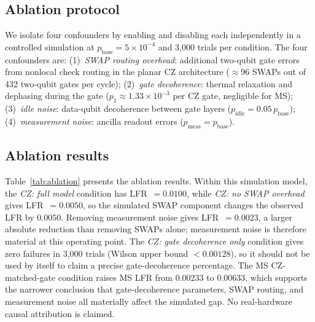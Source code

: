 \documentclass[11pt,a4paper]{article}
\begin{document}
\subsection{Ablation protocol}

We isolate four confounders by enabling and disabling each independently
in a controlled simulation at $p_{\mathrm{base}}=5\times10^{-4}$ and
3{,}000 trials per condition.
The four confounders are:
(1)~\emph{SWAP routing overhead}: additional two-qubit gate errors from
nonlocal check routing in the planar CZ architecture ($\approx96$ SWAPs
out of 432 two-qubit gates per cycle);
(2)~\emph{gate decoherence}: thermal relaxation and dephasing during the
gate ($p_1\approx1.33\times10^{-3}$ per CZ gate, negligible for MS);
(3)~\emph{idle noise}: data-qubit decoherence between gate layers
($p_{\mathrm{idle}}=0.05\,p_{\mathrm{base}}$);
(4)~\emph{measurement noise}: ancilla readout errors
($p_{\mathrm{meas}}=p_{\mathrm{base}}$).

\subsection{Ablation results}

Table~\ref{tab:ablation} presents the ablation results.
Within this simulation model, the \emph{CZ: full model} condition has
LFR~$=0.0100$, while \emph{CZ: no SWAP overhead} gives LFR~$=0.0050$,
so the simulated SWAP component changes the observed LFR by $0.0050$.
Removing measurement noise gives LFR~$=0.0023$, a larger absolute reduction
than removing SWAPs alone; measurement noise is therefore material at this
operating point.
The \emph{CZ: gate decoherence only} condition gives zero failures in
3{,}000 trials (Wilson upper bound $<0.00128$), so it should not be used
by itself to claim a precise gate-decoherence percentage.
The MS CZ-matched-gate condition raises MS LFR from $0.00233$ to $0.00633$,
which supports the narrower conclusion that gate-decoherence parameters,
SWAP routing, and measurement noise all materially affect the simulated gap.
No real-hardware causal attribution is claimed.
\end{document}
